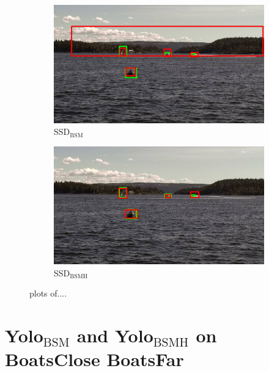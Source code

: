 \begin{figure}
\begin{subfigure}{.5\textwidth}
  \centering
  \includegraphics[width=0.9\linewidth]{results/case_buildings/bigbox_bcbf/SSD2/selected_08_14_frame1150.jpg}
  \caption{SSD$_{\text{BSM}}$}
  \label{fig:sfig1}
\end{subfigure}%
\begin{subfigure}{.5\textwidth}
  \centering
  \includegraphics[width=.9\linewidth]{results/case_buildings/bigbox_bcbf/SSD3/selected_08_14_frame1150.jpg}
  \caption{SSD$_{\text{BSMH}}$}
  \label{fig:sfig2}
\end{subfigure}

\caption{plots of....}
\label{fig:fig}
\end{figure}

\newpage

\section{Yolo$_{\text{BSM}}$ and Yolo$_{\text{BSMH}}$ on BoatsClose BoatsFar}
\label{sec:yolo23_bcbf}


